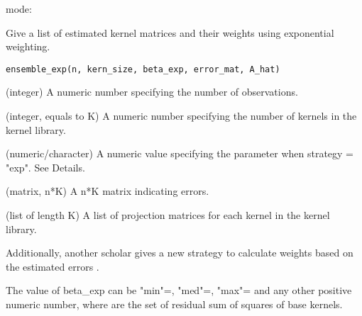 \documentclass[a4paper]{book}
\begin{document}
%
\begin{SeeAlso}\relax
mode: 
\end{SeeAlso}
%
\begin{Description}\relax
Give a list of estimated kernel matrices and their weights using exponential
weighting.
\end{Description}
%
\begin{Usage}
\begin{verbatim}
ensemble_exp(n, kern_size, beta_exp, error_mat, A_hat)
\end{verbatim}
\end{Usage}
%
\begin{Arguments}
\begin{ldescription}
\item[\code{n}] (integer) A numeric number specifying the number of observations.

\item[\code{kern\_size}] (integer, equals to K) A numeric number specifying the
number of kernels in the kernel library.

\item[\code{beta\_exp}] (numeric/character) A numeric value specifying the parameter
when strategy = "exp". See Details.

\item[\code{error\_mat}] (matrix, n*K) A n\bsl{}*K matrix indicating errors.

\item[\code{A\_hat}] (list of length K) A list of projection matrices for each
kernel in the kernel library.
\end{ldescription}
\end{Arguments}
%
\begin{Details}\relax
{}

Additionally, another scholar gives a new strategy to calculate weights
based on the estimated errors .


The value of beta\_exp can be "min"=,
"med"=, "max"= and any
other positive numeric number, where  are the set of
residual sum of squares of  base kernels.
\end{Details}
\end{document}
